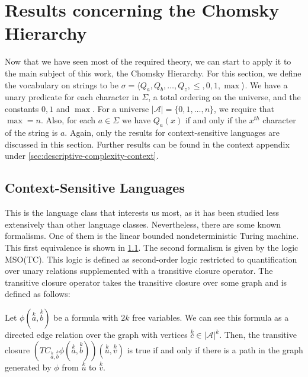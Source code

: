 \section{Results concerning the Chomsky Hierarchy}\label{sec:results-concerning-the-chomsky-hierarchy}


Now that we have seen most of the required theory, we can start to apply it to the main subject of this work, the Chomsky Hierarchy.
For this section, we define the vocabulary on strings to be $\sigma = \langle Q_a, Q_b, \dots, Q_z, \leq , 0, 1, \max \rangle$.
We have a unary predicate for each character in $\Sigma$, a total ordering on the universe, and the constants $0, 1$ and $\max$.
For a universe $| \mathcal{A} | = \{0, 1, \dots, n\}$, we require that $\max = n$. Also, for each $a \in \Sigma$ we have $Q_a(x)$ if and only if the $x^{th}$ character of the string is $a$.
Again, only the results for context-sensitive languages are discussed in this section.
Further results can be found in the context appendix under \cref{sec:descriptive-complexity-context}.

\subsection{Context-Sensitive Languages}\label{subsec:des-context-sensitive-languages}

This is the language class that interests us most, as it has been studied less extensively than other language classes.
Nevertheless, there are some known formalisms.
One of them is the linear bounded nondeterministic Turing machine.
This first equivalence is shown in \cref{subsec:des-context-sensitive-languages}.
The second formalism is given by the logic MSO(TC).
This logic is defined as second-order logic restricted to quantification over unary relations supplemented with a transitive closure operator.
The transitive closure operator takes the transitive closure over some graph and is defined as follows:

\begin{define}
    Let $\phi\left(\overset{k}{a}, \overset{k}{b}\right)$ be a formula with $2k$ free variables.
    We can see this formula as a directed edge relation over the graph with vertices $\overset{k}{c} \in | \mathcal{A} |^{k}$.
    Then, the transitive closure $\left(TC_{\overset{k}{a}, \overset{k}{b}}\phi\left(\overset{k}{a}, \overset{k}{b}\right)\right)\left(\overset{k}{u}, \overset{k}{v}\right)$ is true if and only if there is a path in the graph generated by $\phi$ from $\overset{k}{u}$ to $\overset{k}{v}$.
\end{define}

